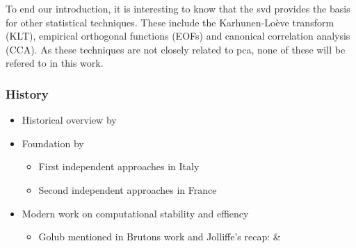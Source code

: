 To end our introduction, it is interesting to know that the \gls{svd} provides the basis for other statistical techniques.
These include the Karhunen-Loève transform (KLT), empirical orthogonal functions (EOFs) and canonical correlation analysis (CCA).
As these techniques are not closely related to \gls{pca}, none of these will be refered to in this work.





\clearpage



\subsubsection{History}

\begin{itemize}
	\item Historical overview by \cite{stewart1993early}
	\item Foundation by
	\begin{itemize}
		\item First independent approaches in Italy \cite{beltrami1873sulle}
		\item Second independent approaches in France \cite{Jordan1874}	
	\end{itemize}
	\item Modern work on computational stability and effiency \cite{brunton2019data}
	\begin{itemize}
		\item Golub mentioned in Brutons work and Jolliffe's recap: \cite{golub1965calculating} \& \cite{golub1971singular}
	\end{itemize}
\end{itemize}

